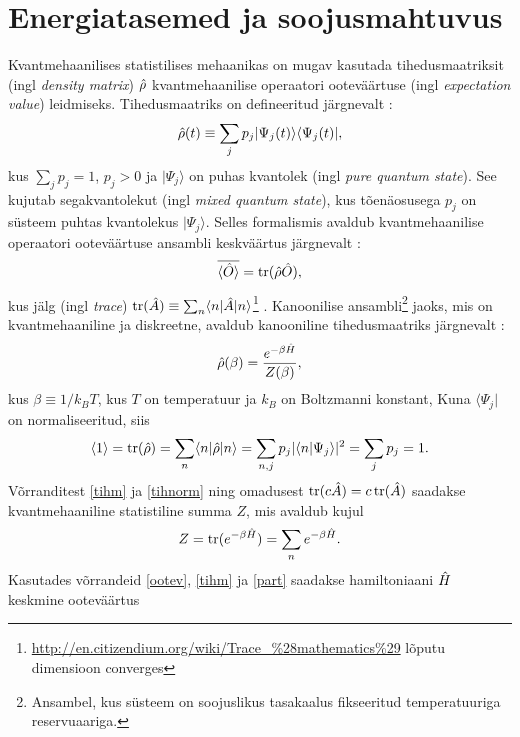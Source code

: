 \documentclass{trkut}%
\DeclareMathOperator{\tr}{tr}
\renewcommand\bra[1]{{\langle{#1}|}}
\renewcommand\ket[1]{{|{#1}\rangle}}
\renewcommand\braket[1]{\langle{#1}\rangle}
\begin{document}
\section{Energiatasemed ja soojusmahtuvus}
Kvantmehaanilises statistilises mehaanikas on mugav kasutada tihedusmaatriksit (ingl \textit{density matrix}) $\op{\rho}$ kvantmehaanilise operaatori ooteväärtuse (ingl \textit{expectation value}) leidmiseks.
Tihedusmaatriks on defineeritud järgnevalt \parencite[172]{kardar07}:
\begin{equation}
    \op{\rho}(t) \equiv \sum_j p_j \ket{\Psi_j(t)} \bra{\Psi_j(t)},
\end{equation}
kus $\sum_j p_j=1$, $p_j > 0$ ja $\ket{\Psi_j}$ on puhas kvantolek (ingl \textit{pure quantum state}).
See kujutab segakvantolekut (ingl \textit{mixed quantum state}), kus tõenäosusega $p_j$ on süsteem puhtas kvantolekus $\ket{\Psi_j}$.
Selles formalismis avaldub kvantmehaanilise operaatori ooteväärtuse ansambli keskväärtus järgnevalt \parencite[172]{kardar07}:
\begin{equation}
    \overline{\braket{\op{O}}}=\tr(\op{\rho}\op{O}),
    \label{ootev}
\end{equation}
kus jälg (ingl \textit{trace}) $\tr(\op{A}) \equiv \sum_n \braket{n|\op{A}|n}$\footnote{\url{http://en.citizendium.org/wiki/Trace_\%28mathematics\%29} lõputu dimensioon converges} \parencite{viide}.
Kanoonilise ansambli\footnote{Ansambel, kus süsteem on soojuslikus tasakaalus fikseeritud temperatuuriga reservuaariga.} jaoks, mis on kvantmehaaniline ja diskreetne, avaldub kanooniline tihedusmaatriks järgnevalt \parencite[174]{kardar07}:
\begin{equation}
    \op{\rho}(\beta) = \frac{e^{-\beta \op{H}}}{Z(\beta)},
    \label{tihm}
\end{equation}
kus $\beta \equiv 1/k_B T$, kus $T$ on temperatuur ja $k_B$ on Boltzmanni konstant,
Kuna $\bra{\Psi_j}$ on normaliseeritud, siis
\begin{equation}
    \braket{1}=\tr(\op{\rho})=\sum_n \braket{n|\op{\rho}|n}=\sum_{n, j} p_j |\braket{n| \Psi_j}|^2=\sum_j p_j=1.
    \label{tihnorm}
\end{equation}
Võrranditest \eqref{tihm} ja \eqref{tihnorm} ning omadusest $\tr(c\op{A})=c\tr(\op{A})$ saadakse kvantmehaaniline statistiline summa $Z$, mis avaldub kujul
\begin{equation}
    Z=\tr(e^{-\beta \op{H}})=\sum_n e^{-\beta \op{H}}.
    \label{part}
\end{equation}
Kasutades võrrandeid \eqref{ootev}, \eqref{tihm} ja \eqref{part} saadakse hamiltoniaani $\op{H}$ keskmine ooteväärtus
\end{document}
